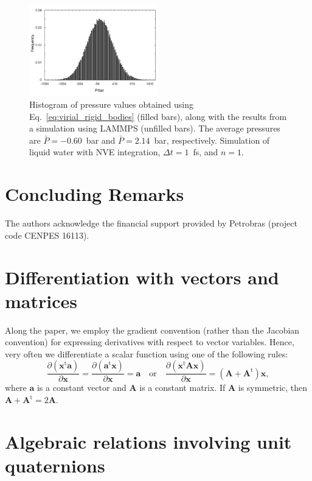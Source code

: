 \documentclass[aip,jcp,reprint,amsmath,amssymb]{revtex4-1}
\newcommand{\mt}[1]{\boldsymbol{\mathbf{#1}}}           %
\newcommand{\vt}[1]{\boldsymbol{\mathbf{#1}}}           %
\newcommand{\tr}[1]{#1^\text{t}}                        %
\newcommand{\diff}[2]{\dfrac{\partial #1}{\partial #2}} %
\begin{document}
\begin{figure}
	\includegraphics[width=0.5\textwidth,keepaspectratio]{FiguraAna}
	\caption{Histogram of pressure values obtained using Eq.~\ref{eq:virial_rigid_bodies} (filled bars), along with the results from a simulation using LAMMPS (unfilled bars). The average pressures are $\bar{P} = -0.60$~bar and $\bar{P} = 2.14$~bar, respectively. Simulation of liquid water with NVE integration, $\Delta t = 1$~fs, and $n = 1$.}
	\label{fig:pressure}
\end{figure}

\section{Concluding Remarks}
\label{sec:conclusion}

\begin{acknowledgments}
The authors acknowledge the financial support provided by Petrobras (project code CENPES 16113).
\end{acknowledgments}

\appendix

\section{Differentiation with vectors and matrices}
\label{sec:Diff_Rules}

Along the paper, we employ the gradient convention (rather than the Jacobian convention) for expressing derivatives with respect to vector variables. Hence, very often we differentiate a scalar function using one of the following rules:
\[
\diff{(\tr{\vt x}\vt a)}{\vt x} = \diff{(\tr{\vt a}\vt x)}{\vt x} = \vt a \quad \text{or} \quad \diff{(\tr{\vt x}\mt A \vt x)}{\vt x} = (\mt A + \tr{\mt A})\vt x,
\]
where $\vt a$ is a constant vector and $\mt A$ is a constant matrix. If $\mt A$ is symmetric, then $\mt A + \tr{\mt A} = 2\mt A$.

\section{Algebraic relations involving unit quaternions}
\label{sec:auxiliary_math}
\end{document}
